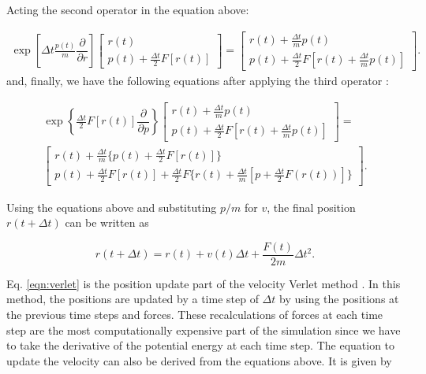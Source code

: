 Acting the second operator in the equation above:

\begin{equation}
\begin{aligned}
\exp \left[ \Delta t \frac{p(t)}{m}\dfrac{\partial }{\partial r} \right]
\left[ \begin{array}{c} r(t) \\ p(t) + \frac{\Delta t}{2} F[r(t)] \end{array} \right] = 
\left[ \begin{array}{c} r(t) + \frac{\Delta t}{m}p(t) \\ p(t) + \frac{\Delta t}{2} F[r(t) + \frac{\Delta t}{m}p(t) ] \end{array} \right] .
\end{aligned}
\end{equation}
and, finally, we have the following equations after applying the third operator :

\begin{equation}
\begin{aligned}
\exp \left \lbrace \frac{\Delta t}{2} F[r(t)] \dfrac{\partial}{\partial p} \right \rbrace
\left[ \begin{array}{c} r(t) + \frac{\Delta t}{m}p(t) \\ p(t) + \frac{\Delta t}{2} F[r(t) + \frac{\Delta t}{m}p(t) ] \end{array} \right]= \\ 
\left[ \begin{array}{c} r(t) + \frac{\Delta t}{m} \lbrace p(t)+\frac{\Delta t}{2} F[r(t)]\rbrace \\ p(t) + \frac{\Delta t}{2} F[r(t)] + \frac{\Delta t}{2} F\{r(t)+ \frac{\Delta t}{m} [p + \frac{\Delta t}{2}F(r(t))]\}\end{array} \right] .
\end{aligned}
\end{equation}

Using the equations above and substituting $p/m$ for $v$, the final position $r(t+\Delta t)$ can be written as

\begin{equation}
r(t+ \Delta t) = r(t) +v(t) \Delta t + \frac{F(t)}{2m} \Delta t^{2}.
\label{eqn:verlet}
\end{equation}

Eq.  \ref{eqn:verlet} is the position update part of the velocity Verlet method \cite{verlet}. In this method, the positions are updated by a time step of $\Delta t$ by using the positions at the previous time steps and forces. These recalculations of forces at each time step are the most computationally expensive part of the simulation since we have to take the derivative of the potential energy at each time step. The equation to update the velocity can also be derived from the equations above. It is given by

